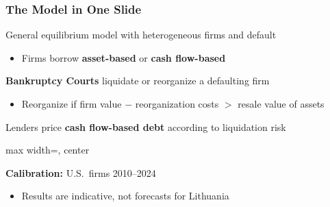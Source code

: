 \documentclass[aspectratio=169,xcolor=table]{beamer}
\begin{document}
\begin{frame}[label=ModelSummary] \frametitle{The Model in One Slide \hfill \hyperlink{slide_outline}{} \hyperlink{ModelFit}{}}

General equilibrium model with heterogeneous firms and default
\begin{itemize} \small
    \item Firms borrow \textbf{asset-based} or \textbf{cash flow-based}
\end{itemize} \normalsize


\textbf{Bankruptcy Courts} liquidate or reorganize a defaulting firm \hfill \hyperlink{LiqReorg2}{}
\begin{itemize} \small
    \item Reorganize if \; firm value $-$ reorganization costs \; $>$ \; resale value of assets
\end{itemize} \normalsize \vspace{2mm}

Lenders price \textbf{cash flow-based debt} according to liquidation risk \vspace{1mm}

\noindent\begin{adjustbox}{max width=\textwidth, center}
\end{adjustbox}\par\vspace{1mm}

\textbf{Calibration:} U.S.\ firms 2010--2024\begin{itemize} \small
    \item Results are indicative, not forecasts for Lithuania
\end{itemize}

\end{frame}
\end{document}
